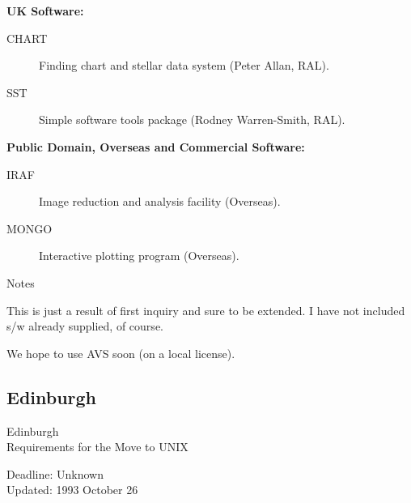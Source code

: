 \begin{center}
{\bf UK Software:}
\end{center}

\begin{description}
\item[CHART] Finding chart and stellar data system (Peter Allan, RAL).
\item[SST] Simple software tools package (Rodney Warren-Smith, RAL).
\end{description}


\vspace{5mm}
\begin{center}
{\bf Public Domain, Overseas and Commercial Software:}
\end{center}

\begin{description}
\item[IRAF] Image reduction and analysis facility (Overseas).
\item[MONGO] Interactive plotting program (Overseas).
\end{description}


\vspace{5mm}
\begin{center}
{\large\sc Notes}
\end{center}

This is just a result of first inquiry and sure to be extended.
I have not included s/w already supplied, of course.

We hope to use AVS soon (on a local license).


\newpage
\subsection{Edinburgh}

\renewcommand{\starsitename}{Edinburgh}
\renewcommand{\starnodename}{REVAD}

\renewcommand{\starunixdate}{Unknown}
\renewcommand{\starupdate}{1993 October 26}

\renewcommand{\starsitetelephone}{031 668 8377}
\renewcommand{\starsitefax}{031 668 8264}

\begin{center}
{\Large\sc \starsitename \\ [2ex]
           Requirements for the Move to UNIX}

\vspace{3mm}
{\large\sc Deadline: \starunixdate \\ [1ex]
           Updated: \starupdate}
\end{center}

